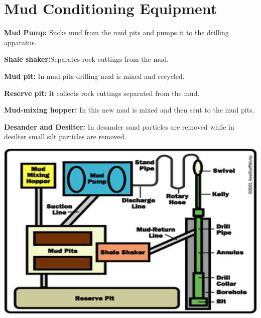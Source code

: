 \chapter{Mud Conditioning Equipment}

\textbf{Mud Pump:} Sucks mud from the mud pits and pumps it to the drilling apparatus.

\vspace{1em}

\textbf{Shale shaker:}Separates rock cuttings from the mud.

\vspace{1em}

\textbf{Mud pit:} In mud pits drilling mud is mixed and recycled. 

\vspace{1em}

\textbf{Reserve pit:} It collects rock cuttings separated from the mud.

\vspace{1em}

\textbf{Mud-mixing hopper:} In this new mud is mixed and then sent to the mud pits.

\vspace{1em}

\textbf{Desander and Desilter:} In desander sand particles are removed while in desilter small silt particles are removed.

\vspace{2em}

\includegraphics[scale=0.7]{images/Mudconditingequipment}

